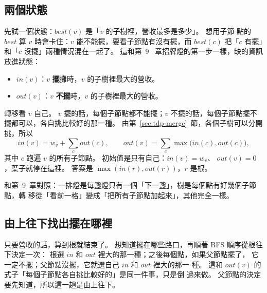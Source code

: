 \subsection{兩個狀態}

先試一個狀態：$\mathit{best}(v)$ 是「$v$ 的子樹裡，營收最多是多少」。 想用子節
點的 $\mathit{best}$ 算 $v$ 時會卡住：$v$ 能不能擺，要看子節點有沒有擺，而
$\mathit{best}(c)$ 把「$c$ 有擺」和「$c$ 沒擺」兩種情況混在一起了。 這和第~9
~章招牌燈的第一步一樣，缺的資訊放進狀態：

\begin{itemize}
\item $\mathit{in}(v)$：$v$ \textbf{擺}攤時，$v$ 的子樹裡最大的營收。
\item $\mathit{out}(v)$：$v$ \textbf{不擺}時，$v$ 的子樹裡最大的營收。
\end{itemize}

轉移看 $v$ 自己。 $v$ 擺的話，每個子節點都不能擺；$v$ 不擺的話，每個子節點擺不
擺都可以，各自挑比較好的那一種。 由第~\ref{sec:tdp-merge}~節，各個子樹可以分開
挑，所以
\[
\mathit{in}(v) = w_v + \sum_{c} \mathit{out}(c),\qquad
\mathit{out}(v) = \sum_{c} \max\bigl(\mathit{in}(c), \mathit{out}(c)\bigr),
\]
其中 $c$ 跑遍 $v$ 的所有子節點。 初始值是只有自己：$\mathit{in}(v) = w_v$、
$\mathit{out}(v) = 0$，葉子就停在這裡。 答案是 $\max(\mathit{in}(r),
\mathit{out}(r))$，$r$ 是根。

和第~9~章對照：一排燈是每盞燈只有一個「下一盞」，樹是每個點有好幾個子節點，轉
移從「看前一格」變成「把所有子節點加起來」，其他完全一樣。

\subsection{由上往下找出擺在哪裡}

只要營收的話，算到根就結束了。 想知道擺在哪些路口，再順著 BFS 順序從根往下決定一次：
根選 $\mathit{in}$ 和 $\mathit{out}$ 裡大的那一種；之後每個點，如果父節點擺了，
它一定不擺；父節點沒擺，它就選自己 $\mathit{in}$ 和 $\mathit{out}$ 裡大的那一
種。 這和 $\mathit{out}(v)$ 的式子「每個子節點各自挑比較好的」是同一件事，只是倒
過來做。 父節點的決定要先知道，所以這一趟是由上往下。

